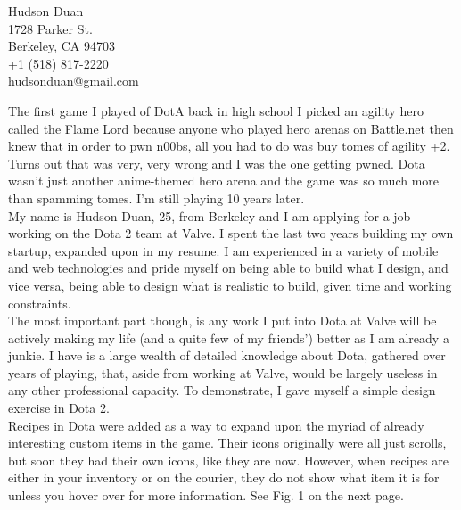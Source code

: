 \documentclass[10pt, letterpaper, UTF-8]{article}
\begin{document}
\begin{flushright}
Hudson Duan\\
1728 Parker St.\\
Berkeley, CA 94703\\
+1 (518) 817-2220\\
hudsonduan@gmail.com\\
\end{flushright}
\bigskip
\hspace{4ex}The first game I played of DotA back in high school I picked an agility hero called the Flame Lord because anyone who played hero arenas on Battle.net then knew that in order to pwn n00bs, all you had to do was buy tomes of agility +2. Turns out that was very, very wrong and I was the one getting pwned. Dota wasn't just another anime-themed hero arena and the game was so much more than spamming tomes. I'm still playing 10 years later.\\ 

My name is Hudson Duan, 25, from Berkeley and I am applying for a job working on the Dota 2 team at Valve. I spent the last two years building my own startup, expanded upon in my resume. I am experienced in a variety of mobile and web technologies and pride myself on being able to build what I design, and vice versa, being able to design what is realistic to build, given time and working constraints.\\

The most important part though, is any work I put into Dota at Valve will be actively making my life (and a quite few of my friends') better as I am already a junkie. I have is a large wealth of detailed knowledge about Dota, gathered over years of playing, that, aside from working at Valve, would be largely useless in any other professional capacity. To demonstrate, I gave myself a simple design exercise in Dota 2.\\

Recipes in Dota were added as a way to expand upon the myriad of already interesting custom items in the game. Their icons originally were all just scrolls, but soon they had their own icons, like they are now. However, when recipes are either in your inventory or on the courier, they do not show what item it is for unless you hover over for more information. See Fig. 1 on the next page.\\
\end{document}
